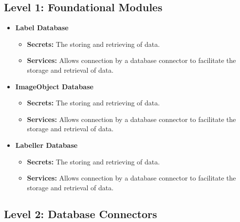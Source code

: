 \documentclass[12pt, titlepage]{article}
\begin{document}

\subsection*{Level 1: Foundational Modules}

\begin{itemize}
    \item \textbf{Label Database}
    \begin{itemize}
        \item \textbf{Secrets:} The storing and retrieving of data.
        \item \textbf{Services:} Allows connection by a database connector to facilitate the storage and retrieval of data.
    \end{itemize}
    \item \textbf{ImageObject Database}
    \begin{itemize}
        \item \textbf{Secrets:} The storing and retrieving of data.
        \item \textbf{Services:} Allows connection by a database connector to facilitate the storage and retrieval of data.
    \end{itemize}
    \item \textbf{Labeller Database}
    \begin{itemize}
        \item \textbf{Secrets:} The storing and retrieving of data.
        \item \textbf{Services:} Allows connection by a database connector to facilitate the storage and retrieval of data.
    \end{itemize}
\end{itemize}

\subsection*{Level 2: Database Connectors}
\end{document}
